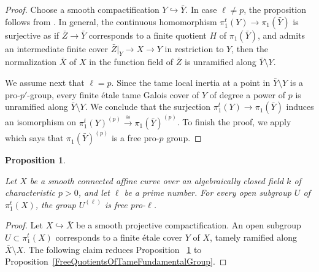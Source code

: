 \documentclass[12pt]{amsart}
\theoremstyle{plain}
\newtheorem{prop}[thm]{Proposition}
\theoremstyle{definition}
\numberwithin{thm}{section}
\numberwithin{equation}{section}
\begin{document}
\begin{proof}
 
Choose a smooth compactification $Y\hookrightarrow \bar Y$. 
In case $\ell \neq p$, the proposition follows from \cite[Theorem 10.1.6]{NSW13}.
In general, the continuous homomorphism
$\pi_1^t(Y)\to \pi_1(\bar Y)$ is surjective as if $\bar Z\to \bar Y$ corresponds to a finite quotient $H$ of $\pi_1(\bar Y)$, and admits an intermediate finite cover $\bar Z|_Y\to X\to Y$ in restriction to $Y$, then the normalization $\bar X$ of $X$ in the function field of $\bar Z $ is unramified along $\bar Y\setminus Y$. 



We assume next that $\ell = p$. 
Since the tame local inertia at a point in $\bar Y\setminus Y$ is a pro-$p'$-group, 
every finite \'{e}tale tame Galois cover of $Y$ of degree a power of $p$  is unramified along $\bar Y\setminus Y$.
We conclude that  the surjection $\pi_1^t(Y)\to \pi_1(\bar Y)$ induces an isomorphism on
$\pi^t_1(Y)^{(p)} \xrightarrow{\cong} \pi_1(\bar{Y})^{(p)}$.
To finish the proof, we apply \cite[Theorem 2]{Sha47} which says that $\pi_1(\bar Y)^{(p)}$ is a free pro-$p$ group. 
\end{proof}


\begin{prop} \label{ProEllFreenessCor}

Let $X$ be a smooth connected affine curve over an algebraically closed field $k$ of characteristic $p>0$, and let $\ell$ be a prime number. 
For every open subgroup $U$ of $\pi_1^t(X)$, the group $U^{(\ell)}$ is free pro-$\ell$. 

\end{prop}

\begin{proof}
Let $X\hookrightarrow \bar X$ be a smooth projective compactification. 
An open subgroup $U \subset \pi_1^t(X)$ corresponds to a finite \'{e}tale cover $Y$ of $X$, tamely ramified along $\bar X\setminus X$.  The following claim reduces Proposition~ \ref{ProEllFreenessCor} to 
Proposition~\ref{FreeQuotientsOfTameFundamentalGroup}.
\end{proof}
\end{document}
